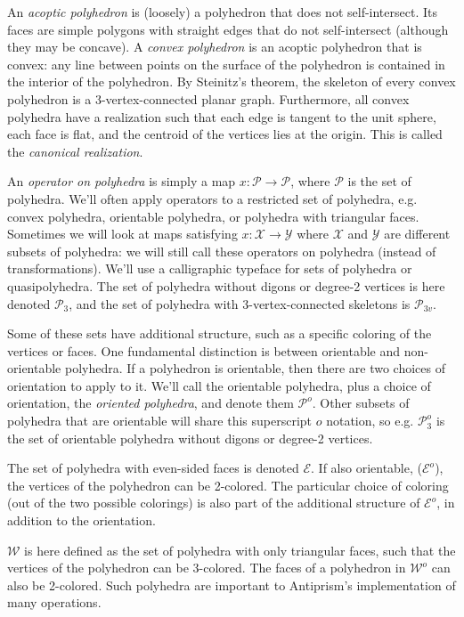 \documentclass{amsart}[12pt]
\begin{document}
An \textit{acoptic polyhedron} is (loosely) a polyhedron that does not
self-intersect. \cite{grunbaum99} Its faces are simple polygons with straight
edges that do not self-intersect (although they may be concave). A
\textit{convex polyhedron} is an acoptic polyhedron that is convex: any line
between points on the surface of the polyhedron is contained in the interior of
the polyhedron. By Steinitz's theorem, the skeleton of every convex polyhedron
is a 3-vertex-connected planar graph. Furthermore, all convex polyhedra have a
realization such that each edge is tangent to the unit sphere, each face is
flat, and the centroid of the vertices lies at the origin.\cite{ziegler}
This is called the \textit{canonical realization}.

An \textit{operator on polyhedra} is simply a map $x : \mathcal{P} \to
\mathcal{P}$, where $\mathcal{P}$ is the set of polyhedra. We'll often apply
operators to a restricted set of polyhedra, e.g. convex polyhedra, orientable
polyhedra, or polyhedra with triangular faces. Sometimes we will look at maps
satisfying $x : \mathcal{X} \to \mathcal{Y}$ where $\mathcal{X}$ and
$\mathcal{Y}$ are different subsets of polyhedra: we will still call these
operators on polyhedra (instead of transformations). We'll use a calligraphic
typeface for sets of polyhedra or quasipolyhedra. The set of polyhedra without
digons or degree-2 vertices is here denoted $\mathcal{P}_3$, and the set of
polyhedra with 3-vertex-connected skeletons is $\mathcal{P}_{3v}$.

Some of these sets have additional structure, such as a specific coloring of
the vertices or faces. One fundamental distinction is between orientable and
non-orientable polyhedra. If a polyhedron is orientable, then there are two
choices of orientation to apply to it. We'll call the orientable polyhedra,
plus a choice of orientation, the \textit{oriented polyhedra}, and denote them
$\mathcal{P}^o$. Other subsets of polyhedra that are orientable will share this
superscript $o$ notation, so e.g. $\mathcal{P}^o_3$ is the set of orientable
polyhedra without digons or degree-2 vertices.

The set of polyhedra with even-sided faces is denoted $\mathcal{E}$. If also
orientable, ($\mathcal{E}^o$), the vertices of the polyhedron can be 2-colored.
The particular choice of coloring (out of the two possible colorings) is also
part of the additional structure of $\mathcal{E}^o$,
in addition to the orientation.

$\mathcal{W}$ is here defined as the set of polyhedra with only triangular
faces, such that the vertices of the polyhedron can be 3-colored. The faces of
a polyhedron in $\mathcal{W}^o$ can also be 2-colored. Such polyhedra are
important to Antiprism's implementation of many operations.
\end{document}
